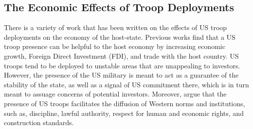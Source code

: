 \documentclass[12pt]{article}
\begin{document}
\begin{doublespace}
\section{The Economic Effects of Troop Deployments}

There is a variety of work that has been written on the effects of US troop deployments on the economy of the host-state. Previous works find that a US troop presence can be helpful to the host economy by increasing economic growth, Foreign Direct Investment (FDI), and trade with the host country\cite{biglaiser2007following,biglaiser2009interdependence,jones2012us}. US troops tend to be deployed to unstable areas that are unappealing to investors. However, the presence of the US military is meant to act as a guarantee of the stability of the state, as well as a signal of US commitment there, which is in turn meant to assuage concerns of potential investors. Moreover,  argue that the presence of US troops facilitates the diffusion of Western norms and institutions, such as, discipline, lawful authority, respect for human and economic rights, and construction standards. 



\end{doublespace}
\end{document}
